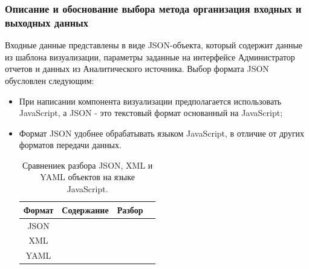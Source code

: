 \documentclass[a4paper]{extarticle}
\begin{document}
\subsubsection{Описание и обоснование выбора метода организация входных и выходных данных}
Входные данные представлены в виде JSON-объекта, который содержит данные из шаблона визуализации, параметры заданные на интерфейсе Администратор отчетов и данных из Аналитического источника. Выбор формата JSON обусловлен следующим:
\begin{itemize}
\item При написании компонента визуализации предполагается использовать JavaScript, а JSON - это текстовый формат основанный на JavaScript;
\item Формат JSON удобнее обрабатывать языком JavaScript, в отличие от других форматов передачи данных.

\begin{table}[H]
\caption{Сравнениек разбора JSON, XML и YAML объектов на языке JavaScript.}
\centering
  \begin{tabular}{|c|c|c|c|}
  \hline
  Формат & Содержание & Разбор \\\hline
  JSON  &  
  & 
  \\\hline
  XML   &  
  & 
  \\\hline
  YAML  & 
  & 
  \\\hline
  \end{tabular}
\end{table}\par
\end{itemize}
\end{document}
